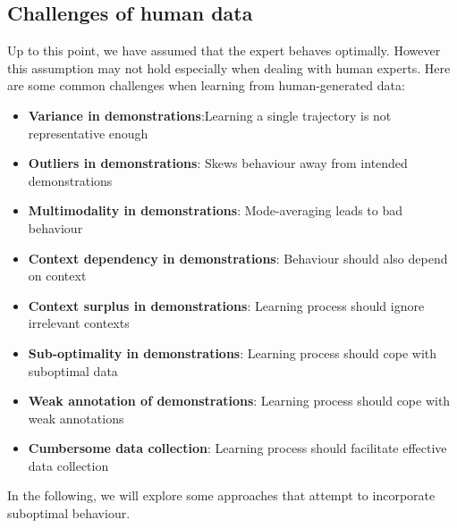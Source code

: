 \subsection{Challenges of human data}
Up to this point, we have assumed that the expert behaves optimally. However this assumption may not hold especially when 
dealing with human experts. Here are some common challenges when learning from human-generated data:
\begin{itemize}
    \item \textbf{Variance in demonstrations}:Learning a single trajectory is not representative enough
    \item \textbf{Outliers in demonstrations}:  Skews behaviour away from intended demonstrations
    \item \textbf{Multimodality in demonstrations}: Mode-averaging leads to bad behaviour
    \item \textbf{Context dependency in demonstrations}: Behaviour should also depend on context
    \item \textbf{Context surplus in demonstrations}: Learning process should ignore irrelevant contexts
    \item \textbf{Sub-optimality in demonstrations}: Learning process should cope with suboptimal data
    \item \textbf{Weak annotation of demonstrations}: Learning process should cope with weak annotations
    \item \textbf{Cumbersome data collection}: Learning process should facilitate effective data collection
\end{itemize}
 In the following, we will explore some approaches that attempt to incorporate suboptimal behaviour.

